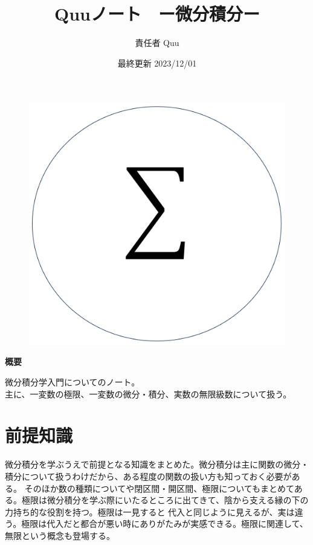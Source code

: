 \documentclass[a4j,dvipdfmx]{jsarticle}
\title{Quuノート　ー微分積分\ajRoman{1}ー}
\date{最終更新 2023/12/01}
\author{責任者 Quu}
\begin{document}
    \maketitle
    \thispagestyle{empty}
    \begin{figure}[h]
        \centering
        \includegraphics[scale=0.5]{img/QuuNote/icon.png}
    \end{figure}
    
    \centerline{\textbf{概要}}
    \noindent
    微分積分学入門についてのノート。\\
    主に、一変数の極限、一変数の微分・積分、実数の無限級数について扱う。
    
    \clearpage
    \label{目次}
    \tableofcontents
    \clearpage
    
    \part{前提知識}
    \begin{screen}
        微分積分を学ぶうえで前提となる知識をまとめた。微分積分は主に関数の微分・積分について扱うわけだから、ある程度の関数の扱い方も知っておく必要がある。
        そのほか数の種類についてや閉区間・開区間、極限についてもまとめてある。極限は微分積分を学ぶ際にいたるところに出てきて、陰から支える縁の下の力持ち的な役割を持つ。極限は一見すると
        代入と同じように見えるが、実は違う。極限は代入だと都合が悪い時にありがたみが実感できる。極限に関連して、無限という概念も登場する。
    \end{screen}
    \clearpage
\end{document}
